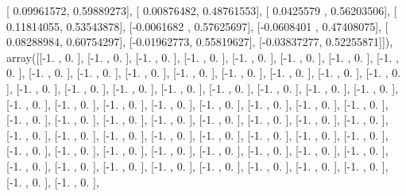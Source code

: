 \documentclass{article}
\begin{document}
       [ 0.09961572,  0.59889273],
       [ 0.00876482,  0.48761553],
       [ 0.0425579 ,  0.56203506],
       [ 0.11814055,  0.53543878],
       [-0.0061682 ,  0.57625697],
       [-0.0608401 ,  0.47408075],
       [ 0.08288984,  0.60754297],
       [-0.01962773,  0.55819627],
       [-0.03837277,  0.52255871]]), array([[-1.        ,  0.        ],
       [-1.        ,  0.        ],
       [-1.        ,  0.        ],
       [-1.        ,  0.        ],
       [-1.        ,  0.        ],
       [-1.        ,  0.        ],
       [-1.        ,  0.        ],
       [-1.        ,  0.        ],
       [-1.        ,  0.        ],
       [-1.        ,  0.        ],
       [-1.        ,  0.        ],
       [-1.        ,  0.        ],
       [-1.        ,  0.        ],
       [-1.        ,  0.        ],
       [-1.        ,  0.        ],
       [-1.        ,  0.        ],
       [-1.        ,  0.        ],
       [-1.        ,  0.        ],
       [-1.        ,  0.        ],
       [-1.        ,  0.        ],
       [-1.        ,  0.        ],
       [-1.        ,  0.        ],
       [-1.        ,  0.        ],
       [-1.        ,  0.        ],
       [-1.        ,  0.        ],
       [-1.        ,  0.        ],
       [-1.        ,  0.        ],
       [-1.        ,  0.        ],
       [-1.        ,  0.        ],
       [-1.        ,  0.        ],
       [-1.        ,  0.        ],
       [-1.        ,  0.        ],
       [-1.        ,  0.        ],
       [-1.        ,  0.        ],
       [-1.        ,  0.        ],
       [-1.        ,  0.        ],
       [-1.        ,  0.        ],
       [-1.        ,  0.        ],
       [-1.        ,  0.        ],
       [-1.        ,  0.        ],
       [-1.        ,  0.        ],
       [-1.        ,  0.        ],
       [-1.        ,  0.        ],
       [-1.        ,  0.        ],
       [-1.        ,  0.        ],
       [-1.        ,  0.        ],
       [-1.        ,  0.        ],
       [-1.        ,  0.        ],
       [-1.        ,  0.        ],
       [-1.        ,  0.        ],
       [-1.        ,  0.        ],
       [-1.        ,  0.        ],
       [-1.        ,  0.        ],
       [-1.        ,  0.        ],
       [-1.        ,  0.        ],
       [-1.        ,  0.        ],
       [-1.        ,  0.        ],
       [-1.        ,  0.        ],
       [-1.        ,  0.        ],
       [-1.        ,  0.        ],
       [-1.        ,  0.        ],
       [-1.        ,  0.        ],
       [-1.        ,  0.        ],
       [-1.        ,  0.        ],
       [-1.        ,  0.        ],
       [-1.        ,  0.        ],
\end{document}
